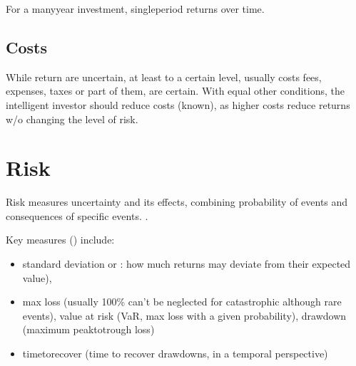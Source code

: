 \documentclass[letterpaper,10pt,english]{jupyterBook}
\begin{document}
\sphinxAtStartPar
For a many\sphinxhyphen{}year investment, single\sphinxhyphen{}period returns {\hyperref[\detokenize{ch/principles/intro_nb:fin-edu-principles-time-compunding}]{}} over time.


\subsection{Costs}
\label{\detokenize{ch/principles/intro_nb:costs}}\label{\detokenize{ch/principles/intro_nb:fin-edu-principles-return-costs}}
\sphinxAtStartPar
While return are uncertain, at least to a certain level, usually costs \sphinxhyphen{} fees, expenses, taxes \sphinxhyphen{} or part of them, are certain. With equal other conditions, the intelligent investor should reduce costs (known), as higher costs reduce returns w/o changing the level of risk.


\section{Risk}
\label{\detokenize{ch/principles/intro_nb:risk}}\label{\detokenize{ch/principles/intro_nb:fin-edu-principles-risk}}
\sphinxAtStartPar
Risk measures uncertainty and its effects, combining probability of events and consequences of specific events. 
.



\sphinxAtStartPar
Key measures () include:
\begin{itemize}
\item {} 
\sphinxAtStartPar
standard deviation or : how much returns may deviate from their expected value),

\item {} 
\sphinxAtStartPar
max loss (usually 100\% can’t be neglected for catastrophic although rare events), value at risk (VaR, max loss with a given probability), drawdown (maximum peak\sphinxhyphen{}to\sphinxhyphen{}trough loss)

\item {} 
\sphinxAtStartPar
time\sphinxhyphen{}to\sphinxhyphen{}recover (time to recover drawdowns, in a temporal perspective)

\end{itemize}
\end{document}
